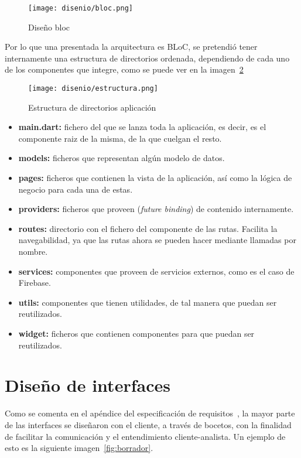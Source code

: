 \begin{figure}[H]
	\centering
	\texttt{[image: disenio/bloc.png]}
	\caption{Diseño bloc}\label{fig:bloc}
\end{figure}

Por lo que una presentada la arquitectura es BLoC, se pretendió tener internamente una estructura de directorios ordenada, dependiendo de cada uno de los componentes que integre, como se puede ver en la imagen~\ref{fig:estructura}

\begin{figure}[H]
	\centering
	\texttt{[image: disenio/estructura.png]}
	\caption{Estructura de directorios aplicación}\label{fig:estructura}
\end{figure}

\begin{itemize}
	\item \textbf{main.dart:} fichero del que se lanza toda la aplicación, es decir, es el componente raiz de la misma, de la que cuelgan el resto.
	
	\item \textbf{models:} ficheros que representan algún modelo de datos. 
	
	\item \textbf{pages:} ficheros que contienen la vista de la aplicación, así como la lógica de negocio para cada una de estas. 
	
	\item \textbf{providers:} ficheros que proveen (\emph{future binding}) de contenido internamente.
	
	\item \textbf{routes:} directorio con el fichero del componente de las rutas. Facilita la navegabilidad, ya que las rutas ahora se pueden hacer mediante llamadas por nombre.
	
	\item \textbf{services:} componentes que proveen de servicios externos, como es el caso de Firebase.
	
	\item \textbf{utils:} componentes que tienen utilidades, de tal manera que puedan ser reutilizados.
	
	\item \textbf{widget:} ficheros que contienen componentes para que puedan ser reutilizados.
	
\end{itemize}

\section{Diseño de interfaces}\label{nterfaces }
Como se comenta en el apéndice del especificación de requisitos~\pageref{requisitos}, la mayor parte de las interfaces se diseñaron con el cliente, a través de bocetos, con la finalidad de facilitar la comunicación y el entendimiento cliente-analista. Un ejemplo de esto es la siguiente imagen~\ref{fig:borrador}.

